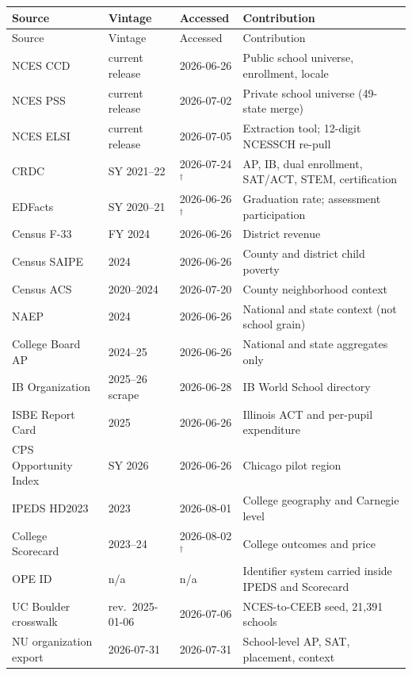\documentclass[12pt]{article}
\begin{document}
{\small\raggedright
\begin{longtable}{@{}p{3.1cm}p{2.2cm}p{2.3cm}p{4.7cm}@{}}
\toprule
Source & Vintage & Accessed & Contribution \\
\midrule
\endfirsthead
\toprule
Source & Vintage & Accessed & Contribution \\
\midrule
\endhead
NCES CCD & current release & 2026-06-26 & Public school universe, enrollment, locale \\
NCES PSS & current release & 2026-07-02 & Private school universe (49-state merge) \\
NCES ELSI & current release & 2026-07-05 & Extraction tool; 12-digit NCESSCH re-pull \\
CRDC & SY 2021--22 & 2026-07-24$^{\dagger}$ & AP, IB, dual enrollment, SAT/ACT, STEM, certification \\
EDFacts & SY 2020--21 & 2026-06-26$^{\dagger}$ & Graduation rate; assessment participation \\
Census F-33 & FY 2024 & 2026-06-26 & District revenue \\
Census SAIPE & 2024 & 2026-06-26 & County and district child poverty \\
Census ACS & 2020--2024 & 2026-07-20 & County neighborhood context \\
NAEP & 2024 & 2026-06-26 & National and state context (not school grain) \\
College Board AP & 2024--25 & 2026-06-26 & National and state aggregates only \\
IB Organization & 2025--26 scrape & 2026-06-28 & IB World School directory \\
ISBE Report Card & 2025 & 2026-06-26 & Illinois ACT and per-pupil expenditure \\
CPS Opportunity Index & SY 2026 & 2026-06-26 & Chicago pilot region \\
IPEDS HD2023 & 2023 & 2026-08-01 & College geography and Carnegie level \\
College Scorecard & 2023--24 & 2026-08-02$^{\dagger}$ & College outcomes and price \\
OPE ID & n/a & n/a & Identifier system carried inside IPEDS and Scorecard \\
UC Boulder crosswalk & rev.\ 2025-01-06 & 2026-07-06 & NCES-to-CEEB seed, 21{,}391 schools \\
NU organization export & 2026-07-31 & 2026-07-31 & School-level AP, SAT, placement, context \\
\bottomrule
\end{longtable}}\addtocounter{table}{-1}
\end{document}

